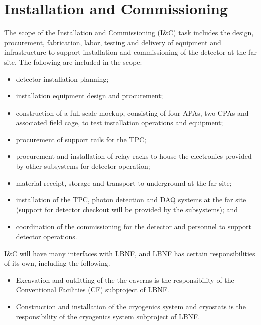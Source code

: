 \section{Installation and Commissioning}
\label{sec:detectors-fd-ref-install}

The scope of the Installation and Commissioning  (I\&C) task includes the
design, procurement, fabrication, labor, testing and delivery of
equipment and infrastructure to support installation and commissioning
of the detector at the far site. The following are included in the
scope:
\begin{itemize}
\item detector installation planning;
\item installation equipment design and procurement;
\item construction of a full scale mockup, consisting of four APAs, two CPAs and associated
  field cage, to test installation operations and
  equipment;
\item procurement of support rails for the TPC;
\item procurement and installation of relay racks to house the
  electronics provided by other subsystems for detector operation;
\item material receipt, storage and transport to underground at the far site;
\item installation of the TPC, photon detection and DAQ systems at the
  far site (support for detector checkout will be provided by the
  subsystems); and
\item coordination of the commissioning for the detector and personnel
  to support detector operations.
\end{itemize}

I\&C will have many interfaces with LBNF, and LBNF
has certain responsibilities of its own, including the following.
\begin{itemize}
\item Excavation and outfitting of the the caverns is the responsibility of
  the Conventional Facilities (CF) subproject of LBNF.
\item Construction and installation of the cryogenics system and
  cryostats is the responsibility of the cryogenics system subproject
  of LBNF.
\end{itemize}

